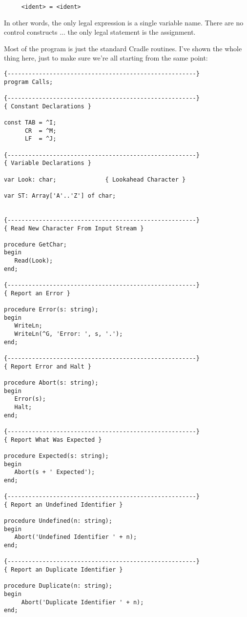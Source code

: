 \begin{verbatim}
     <ident> = <ident>
\end{verbatim}

In  other  words, the only legal expression is a single variable name. There  are no control  constructs  ... the  only  legal statement is the assignment.

Most of the program  is  just the standard Cradle routines. I've shown the whole thing here, just to make sure we're  all starting from the same point:

\begin{verbatim}
{------------------------------------------------------}
program Calls;

{------------------------------------------------------}
{ Constant Declarations }

const TAB = ^I;
      CR  = ^M;
      LF  = ^J;

{------------------------------------------------------}
{ Variable Declarations }

var Look: char;              { Lookahead Character }

var ST: Array['A'..'Z'] of char;


{------------------------------------------------------}
{ Read New Character From Input Stream }

procedure GetChar;
begin
   Read(Look);
end;

{------------------------------------------------------}
{ Report an Error }

procedure Error(s: string);
begin
   WriteLn;
   WriteLn(^G, 'Error: ', s, '.');
end;

{------------------------------------------------------}
{ Report Error and Halt }

procedure Abort(s: string);
begin
   Error(s);
   Halt;
end;

{------------------------------------------------------}
{ Report What Was Expected }

procedure Expected(s: string);
begin
   Abort(s + ' Expected');
end;

{------------------------------------------------------}
{ Report an Undefined Identifier }

procedure Undefined(n: string);
begin
   Abort('Undefined Identifier ' + n);
end;

{------------------------------------------------------}
{ Report an Duplicate Identifier }

procedure Duplicate(n: string);
begin
     Abort('Duplicate Identifier ' + n);
end;


\end{verbatim}
